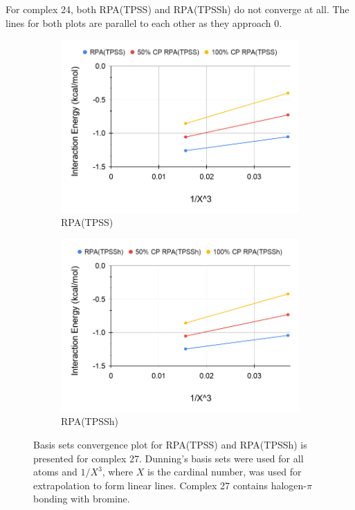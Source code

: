 \documentclass[11pt]{article}
\begin{document}
For complex 24, both RPA(TPSS) and RPA(TPSSh) do not converge at all.
The lines for both plots are parallel to each other as they approach 0.


\begin{figure}[H]
  \centering
  \begin{subfigure}{.5\textwidth}
    \centering
    \includegraphics[scale=0.3]{tpss-27.png}
    \caption{RPA(TPSS)}
    \label{fig:tpss_27}
  \end{subfigure}%
  \begin{subfigure}{.5\textwidth}
    \centering
    \includegraphics[scale=0.3]{tpssh-27.png}
    \caption{RPA(TPSSh)}
    \label{fig:tpssh_27}
  \end{subfigure}
  \caption{Basis sets convergence plot for RPA(TPSS) and RPA(TPSSh) is
    presented for complex 27. Dunning's basis sets were used for all
    atoms and $1/X^3$, where $X$ is the cardinal number, was used for
    extrapolation to form linear lines. Complex 27 contains halogen-$\pi$
    bonding with bromine.}
  \label{fig:complex_27}
\end{figure}
\end{document}
